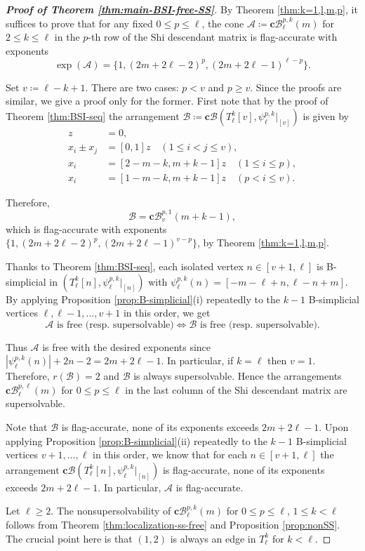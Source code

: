 \documentclass[11pt]{article}
\theoremstyle{definition}
\numberwithin{equation}{section}
\newcommand{\A}{\mathcal{A}}
\newcommand{\B}{\mathcal{B}}
\newcommand{\cc}{\mathbf{c}}
\newcommand{\tbf}{\textbf}
\begin{document}
\begin{proof}[\tbf{Proof of  Theorem \ref{thm:main-BSI-free-SS}}]
By Theorem \ref{thm:k=1,l,m,p}, it suffices to prove that for any fixed $0 \le p \le \ell$, the cone  $\A \coloneqq \cc\B^{p,k}_\ell(m)$  for $2 \le k \le \ell$  in the $p$-th row of the Shi descendant matrix is flag-accurate with exponents  
$$\exp(\A) = \{1, (2m+2\ell-2)^{p}, (2m+2\ell-1)^{\ell-p}\} .$$ 

Set $ v  \coloneqq  \ell-k+1$. 
There are two cases: $p < v$ and  $p \ge v$. 
Since the proofs are similar, we give a proof only for the former. 
First note that by the proof of Theorem \ref{thm:BSI-seq} the arrangement $\B  \coloneqq  \textbf{c} \B(T_{\ell}^{k}[v], \psi_{\ell}^{p, k}|_{[v]})$ is given by 
\begin{align*}
z &= 0 , \\
x_{i}\pm x_{j} &= [0,1]z \quad  (1 \leq i < j \leq v), \\
x_i&=  [2-m-k , m+k-1]z \quad (1 \leq   i \leq p), \\
x_i&= [1-m-k , m+k-1]z   \quad (p<  i \leq v).
\end{align*}

Therefore, 
$$\B= \textbf{c}\B^{p,1}_{v}(m+k-1),$$
which is  flag-accurate with exponents  $  \{1, (2m+2\ell-2)^{p}, (2m+2\ell-1)^{ v-p}\}$, by Theorem \ref{thm:k=1,l,m,p}. 

Thanks to Theorem \ref{thm:BSI-seq}, each isolated vertex $n \in [v+1, \ell] $ is  B-simplicial in  $ (T_{\ell}^{k}[n], \psi_{\ell}^{p,k}|_{[n]})$ with $ \psi_{\ell}^{p,k}(n) = [-m-\ell+n, \ell-n+m]$. 
By applying Proposition \ref{prop:B-simplicial}(i) repeatedly to the $k-1$ B-simplicial vertices $\ell ,\ell-1, \ldots, v+1 $ in this order, we get  
$$ \A \mbox{ is free (resp. supersolvable)} \iff  \B  \mbox{ is free (resp. supersolvable)}  .$$  

Thus   $ \A$ is free with the desired exponents since  $| \psi_{\ell}^{p,k}(n) |+2n-2 =2m+2\ell-1 $. 
In particular, if $k=\ell$ then $v=1$. 
Therefore, $r(\B)=2$ and $\B$ is always supersolvable. 
Hence  the arrangements $\textbf{c} \B^{p,\ell}_\ell(m)$ for $0 \le p \le \ell$ in the last column of the Shi descendant matrix are supersolvable. 

Note that $\B$ is flag-accurate, none of its exponents exceeds $2m+2\ell-1 $. 
Upon applying Proposition \ref{prop:B-simplicial}(ii) repeatedly to the $k-1$ B-simplicial vertices $v+1 , \ldots, \ell $ in this order, we know that for each $n \in [v+1, \ell] $ the arrangement $\cc\B  (T_{\ell}^{k}[n], \psi_{\ell}^{p,k}|_{[n]}) $ is flag-accurate, none of its exponents exceeds $2m+2\ell-1 $. 
In particular, $ \A$ is  flag-accurate. 

Let $\ell \ge 2$. 
The nonsupersolvability of $ \mathbf{c}\B^{p,k}_\ell(m)$ for $0 \le p \le \ell$, $1 \le k < \ell$ follows from Theorem \ref{thm:localization-ss-free} and Proposition \ref{prop:nonSS}. The crucial point here is that $(1,2)$ is always an edge in $T_{\ell}^{k}$ for $ k < \ell $. 
\end{proof}
\end{document}
